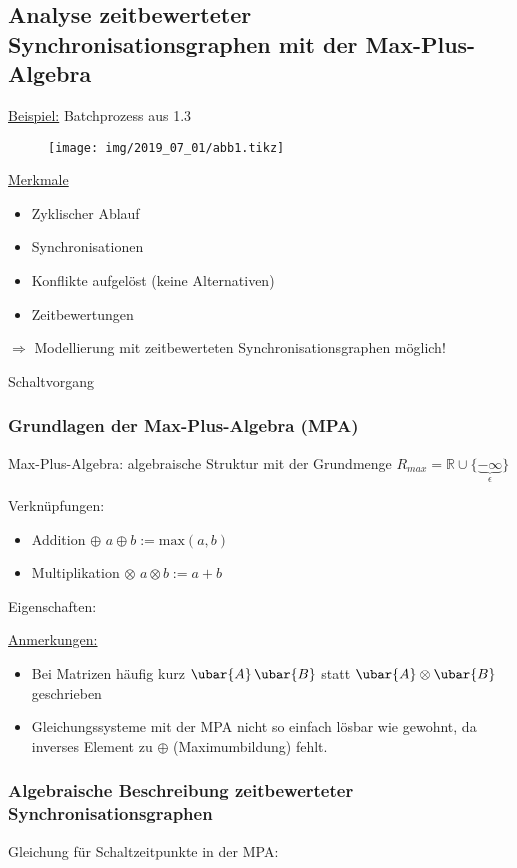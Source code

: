\subsection{Analyse zeitbewerteter Synchronisationsgraphen mit der Max-Plus-Algebra}
\underline{Beispiel:} Batchprozess aus 1.3

\begin{figure}[H]
	\centering
	\texttt{[image: img/2019\_07\_01/abb1.tikz]}
\end{figure}

\underline{Merkmale}
\begin{itemize}
	\item Zyklischer Ablauf
	\item Synchronisationen
	\item Konflikte aufgelöst (keine Alternativen)
	\item Zeitbewertungen
\end{itemize}

$\Rightarrow$ Modellierung mit zeitbewerteten Synchronisationsgraphen möglich!

Schaltvorgang 

\subsubsection{Grundlagen der Max-Plus-Algebra (MPA)}
Max-Plus-Algebra: algebraische Struktur mit der Grundmenge $R_{max}=\mathbb{R} \cup \{\underbrace{-\infty}_{\epsilon}\}$

Verknüpfungen:
\begin{itemize}
	\item Addition $\oplus$
		$a \oplus b := \text{max}(a,b)$
	\item Multiplikation $\otimes$
		$a \otimes b := a + b$
\end{itemize}

Eigenschaften: 

\underline{Anmerkungen:}
\begin{itemize}
	\item Bei Matrizen häufig kurz $\ubar{A} \, \ubar{B}$ statt $\ubar{A} \otimes \ubar{B}$ geschrieben
	\item Gleichungssysteme mit der MPA nicht so einfach lösbar wie gewohnt, da inverses Element zu $\oplus$ (Maximumbildung) fehlt.
\end{itemize}

\subsubsection{Algebraische Beschreibung zeitbewerteter Synchronisationsgraphen}
Gleichung für Schaltzeitpunkte in der MPA: 

